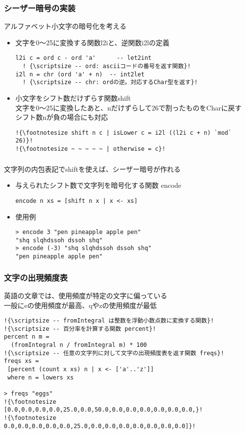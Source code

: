 \documentclass[dvipdfmx,cjk,xcolor=dvipsnames,envcountsect,notheorems,12pt]{beamer}
\theoremstyle{definition}
\begin{document}
\begin{frame}[fragile]
\frametitle{シーザー暗号の実装}
アルファベット小文字の暗号化を考える
\vfill
\begin{itemize}
\item 文字を0〜25に変換する関数l2iと、逆関数i2lの定義
\begin{lstlisting}[escapechar=!]
l2i c = ord c - ord 'a'      -- let2int
  ! {\scriptsize -- ord: asciiコードの番号を返す関数}!
i2l n = chr (ord 'a' + n)  -- int2let
  ! {\scriptsize -- chr: ordの逆。対応するChar型を返す}!
\end{lstlisting}
\item 小文字をシフト数だけずらす関数shift
\\ {\scriptsize 文字を0〜25に変換したあと、nだけずらして26で割ったものをCharに戻す}
\\ {\scriptsize シフト数nが負の場合にも対応}
\begin{lstlisting}[escapechar=!]
!{\footnotesize shift n c | isLower c = i2l ((l2i c + n) `mod` 26)}!
!{\footnotesize ~ ~ ~ ~ ~ | otherwise = c}!
\end{lstlisting}
\end{itemize}
\end{frame}

\begin{frame}[fragile]
\frametitle{}
文字列の内包表記でshiftを使えば、シーザー暗号が作れる
\vfill
\begin{itemize}
\item 与えられたシフト数で文字列を暗号化する関数 encode
\begin{lstlisting}[escapechar=!]
encode n xs = [shift n x | x <- xs]
\end{lstlisting}
\item 使用例
\begin{lstlisting}[escapechar=!]
> encode 3 "pen pineapple apple pen"
"shq slqhdssoh dssoh shq"
> encode (-3) "shq slqhdssoh dssoh shq"
"pen pineapple apple pen"
\end{lstlisting}
\end{itemize}
\end{frame}

\begin{frame}[fragile]
\frametitle{文字の出現頻度表}
英語の文章では、使用頻度が特定の文字に偏っている
\\ 一般にeの使用頻度が最高、qやzの使用頻度が最低
\begin{lstlisting}[escapechar=!]
!{\scriptsize -- fromIntegral は整数を浮動小数点数に変換する関数}!
!{\scriptsize -- 百分率を計算する関数 percent}!
percent n m = 
  (fromIntegral n / fromIntegral m) * 100
!{\scriptsize -- 任意の文字列に対して文字の出現頻度表を返す関数 freqs}!
freqs xs =
 [percent (count x xs) n | x <- ['a'..'z']] 
 where n = lowers xs

> freqs "eggs"
!{\footnotesize [0.0,0.0,0.0,0.0,25.0,0.0,50.0,0.0,0.0,0.0,0.0,0.0,0.0,}!
!{\footnotesize  0.0,0.0,0.0,0.0,0.0,25.0,0.0,0.0,0.0,0.0,0.0,0.0,0.0]}!
\end{lstlisting}
\end{frame}
\end{document}
